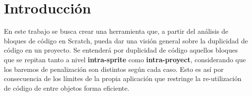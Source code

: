 \documentclass[a4paper, 12pt]{book}
\begin{document}


\tableofcontents 
\cleardoublepage
\listoffigures %



\cleardoublepage
\chapter{Introducción}
\label{sec:intro} %



En este trabajo se busca crear una herramienta que, a partir del análisis de bloques de código en Scratch, pueda dar una visión general sobre la duplicidad de código en un proyecto. Se entenderá por duplicidad de código aquellos bloques que se repitan tanto a nivel \textbf{intra-sprite} como \textbf{intra-proyect}, considerando que los baremos de penalización son distintos según cada caso. Esto es así por consecuencia de los límites de la propia aplicación que restringe la re-utilización de código de entre objetos forma eficiente.
\end{document}
